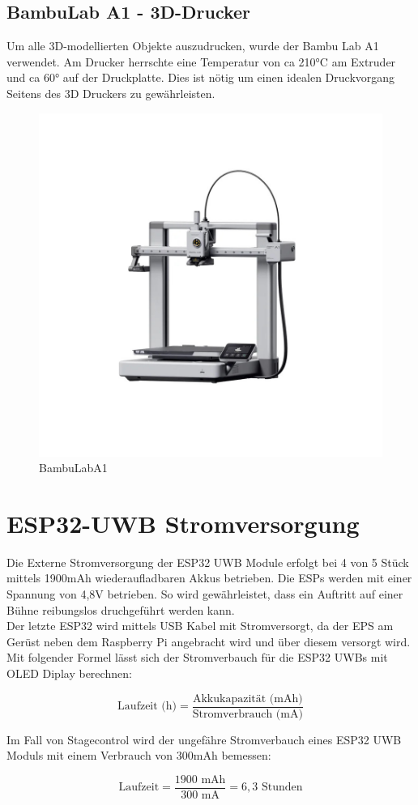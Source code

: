 \subsection{BambuLab A1 - 3D-Drucker}
Um alle 3D-modellierten Objekte auszudrucken, wurde der Bambu Lab A1 verwendet. Am Drucker herrschte eine Temperatur von ca 210°C am Extruder und ca 60° auf der Druckplatte. Dies ist nötig um einen idealen Druckvorgang Seitens des 3D Druckers zu gewährleisten.
\begin{figure}[H]
	\centering
	\includegraphics[width=0.5\linewidth]{images/BambuLabA1.jpg}
	\caption[BambuLabA1]{BambuLabA1}
	\label{fig: BambuLabA1}
\end{figure}

\section{ESP32-UWB Stromversorgung}
Die Externe Stromversorgung der ESP32 UWB Module erfolgt bei 4 von 5 Stück mittels 1900mAh wiederaufladbaren Akkus betrieben. Die ESPs werden mit einer Spannung von 4,8V betrieben. So wird gewährleistet, dass ein Auftritt auf einer Bühne reibungslos druchgeführt werden kann.\\
Der letzte ESP32 wird mittels USB Kabel mit Stromversorgt, da der EPS am Gerüst neben dem Raspberry Pi angebracht wird und über diesem versorgt wird.\\

Mit folgender Formel lässt sich der Stromverbauch für die ESP32 UWBs mit OLED Diplay berechnen:

\[
\text{Laufzeit (h)} = \frac{\text{Akkukapazität (mAh)}}{\text{Stromverbrauch (mA)}}
\]

Im Fall von Stagecontrol wird der ungefähre Stromverbauch eines ESP32 UWB Moduls mit einem Verbrauch von 300mAh bemessen:

\[
\text{Laufzeit} = \frac{1900 \text{ mAh}}{300 \text{ mA}} = 6,3 \text{ Stunden}
\]


